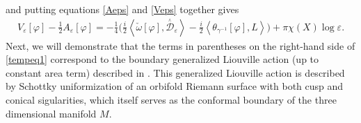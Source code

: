 \documentclass[a4paper,11pt]{article}
\newcommand{\singfund}{\overset{{}_{\curlywedge}}{\mathcal{D}}}
\newcommand{\stks}[1]{
	 \left< #1 \right>
}
\begin{document}
and putting equations \eqref{Aeps} and \eqref{Veps} together gives
\begin{equation}
\begin{aligned}
V_\varepsilon[\varphi] - \frac12 A_\varepsilon[\varphi] = -\frac{1}{4} \Big(\frac{i}{2}
\stks{\check{\omega} [\varphi], \singfund_{\varepsilon}} - \frac{i}{2} \stks{\theta_{\gamma^{-1}}[\varphi],L}
\Big) + \pi \chi(X) \log \varepsilon.
\end{aligned}
\label{tempeq1}
\end{equation}
Next, we will demonstrate that the terms in parentheses on the right-hand side of \eqref{tempeq1} correspond to the boundary generalized Liouville action (up to constant area term) described in \cite{Taghavi2024classical}. This generalized Liouville action is described by Schottky uniformization of an orbifold Riemann surface with both cusp and conical sigularities, which itself serves as the conformal boundary of the three dimensional manifold $M$.  
\end{document}
